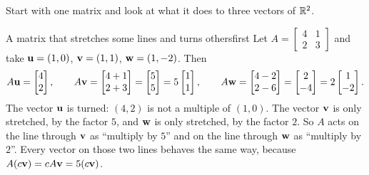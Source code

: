 \documentclass[11pt]{article}
\begin{document}
Start with one matrix and look at what it does to three vectors of $\mathbb{R}^2$.

\begin{exmp}{A matrix that stretches some lines and turns others}{first}
Let $A=\begin{bmatrix}4&1\\2&3\end{bmatrix}$ and take $\mathbf{u}=(1,0)$, $\mathbf{v}=(1,1)$, $\mathbf{w}=(1,-2)$. Then
\[
A\mathbf{u}=\begin{bmatrix}4\\2\end{bmatrix},\qquad
A\mathbf{v}=\begin{bmatrix}4+1\\2+3\end{bmatrix}=\begin{bmatrix}5\\5\end{bmatrix}=5\begin{bmatrix}1\\1\end{bmatrix},\qquad
A\mathbf{w}=\begin{bmatrix}4-2\\2-6\end{bmatrix}=\begin{bmatrix}2\\-4\end{bmatrix}=2\begin{bmatrix}1\\-2\end{bmatrix}.
\]
The vector $\mathbf{u}$ is turned: $(4,2)$ is not a multiple of $(1,0)$. The vector $\mathbf{v}$ is only stretched, by the factor $5$, and $\mathbf{w}$ is only stretched, by the factor $2$. So $A$ acts on the line through $\mathbf{v}$ as ``multiply by $5$'' and on the line through $\mathbf{w}$ as ``multiply by $2$''. Every vector on those two lines behaves the same way, because $A(c\mathbf{v})=cA\mathbf{v}=5(c\mathbf{v})$.
\end{exmp}

\begin{center}
\end{center}
\end{document}
